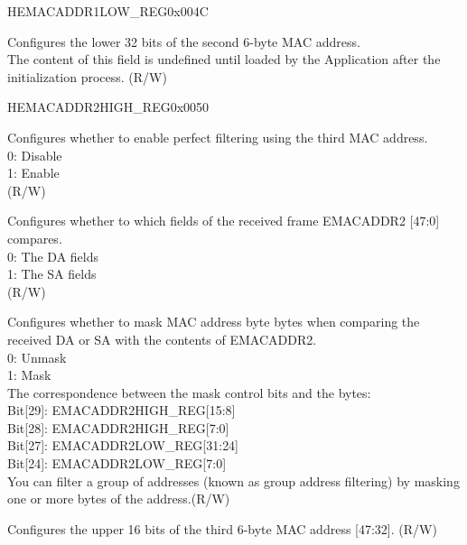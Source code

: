 \begin{register}{H}{EMACADDR1LOW\_REG}{0x004C}\label{regdesc:EMACADDR1LOWREG}
%
\regnewline%
\begin{regdesc}\begin{reglist}
\item [EMACADDR1LOW\_REG] Configures the lower 32 bits of the second 6-byte MAC address.\\The content of this field is undefined until loaded by the Application after the initialization process. (R/W)
\end{reglist}\end{regdesc}
\end{register}


\begin{register}{H}{EMACADDR2HIGH\_REG}{0x0050}\label{regdesc:EMACADDR2HIGHREG}
%
%
%
%
%
\regnewline%
\begin{regdesc}\begin{reglist}
\item [ADDRESS\_ENABLE2] Configures whether to enable perfect filtering using the third MAC address.\\
0: Disable\\
1: Enable\\ (R/W)
\item [SOURCE\_ADDRESS2] Configures whether to which fields of the received frame EMACADDR2 [47:0] compares.\\
0: The DA fields\\
1: The SA fields\\ (R/W)
\item [MASK\_BYTE\_CONTROL2] Configures whether to mask MAC address byte bytes when comparing the received DA or SA with the contents of EMACADDR2.\\
0: Unmask\\
1: Mask\\
The correspondence between the mask control bits and the bytes:\\
Bit[29]: EMACADDR2HIGH\_REG[15:8]\\
Bit[28]: EMACADDR2HIGH\_REG[7:0]\\
Bit[27]: EMACADDR2LOW\_REG[31:24]\\
Bit[24]: EMACADDR2LOW\_REG[7:0]\\
You can filter a group of addresses (known as group address filtering) by masking one or more bytes of the address.(R/W)
\item [MAC\_ADDRESS2\_HI] Configures the upper 16 bits of the third 6-byte MAC address [47:32]. (R/W)
\end{reglist}\end{regdesc}
\end{register}


